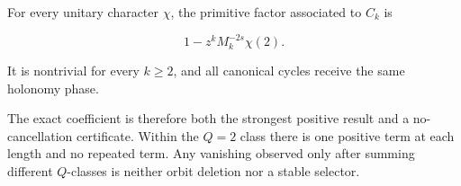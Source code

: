 \begin{corollary}
\label{cor:character-persistence}
For every unitary character \(\chi\), the primitive factor associated to
\(C_k\) is

\[
 1-z^kM_k^{-2s}\chi(2).
\]

It is nontrivial for every \(k\ge2\), and all canonical cycles receive the
same holonomy phase.
\end{corollary}

The exact coefficient is therefore both the strongest positive result and a
no-cancellation certificate.  Within the \(Q=2\) class there is one positive
term at each length and no repeated term.  Any vanishing observed only after
summing different \(Q\)-classes is neither orbit deletion nor a stable
selector.
